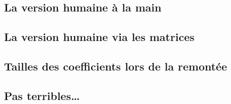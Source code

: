 \subsection{La version \og humaine \fg{} à la main} 






\subsection{La version \og humaine \fg{} via les matrices} 







\subsection{Tailles des coefficients lors de la remontée} \label{human-size}







\subsection{Pas terribles\dots{}} 



